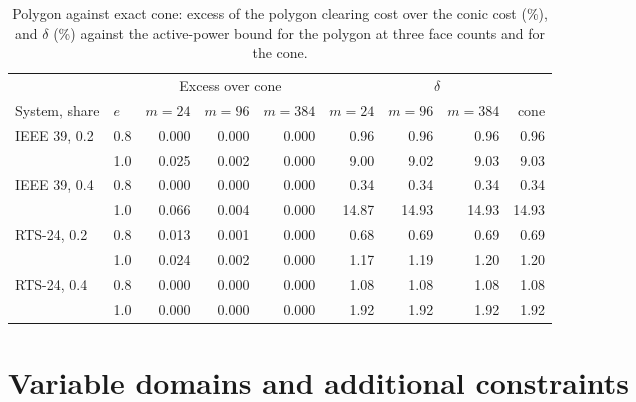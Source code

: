 \documentclass[11pt,a4paper]{article}
\begin{document}
\begin{table}[h]
  \caption{Polygon against exact cone: excess of the polygon clearing cost
  over the conic cost (\%), and $\delta$ (\%) against the active-power bound
  for the polygon at three face counts and for the cone.}
  \label{tab:cone}
  \centering
  \begin{tabular}{ll rrr rrrr}
    \toprule
    & & \multicolumn{3}{c}{Excess over cone} & \multicolumn{4}{c}{$\delta$} \\
    \cmidrule(lr){3-5}\cmidrule(l){6-9}
    System, share & $e$ & $m{=}24$ & $m{=}96$ & $m{=}384$
      & $m{=}24$ & $m{=}96$ & $m{=}384$ & cone \\
    \midrule
    IEEE 39, 0.2 & 0.8 & 0.000 & 0.000 & 0.000 & 0.96 & 0.96 & 0.96 & 0.96 \\
                 & 1.0 & 0.025 & 0.002 & 0.000 & 9.00 & 9.02 & 9.03 & 9.03 \\
    IEEE 39, 0.4 & 0.8 & 0.000 & 0.000 & 0.000 & 0.34 & 0.34 & 0.34 & 0.34 \\
                 & 1.0 & 0.066 & 0.004 & 0.000 & 14.87 & 14.93 & 14.93 & 14.93 \\
    RTS-24, 0.2  & 0.8 & 0.013 & 0.001 & 0.000 & 0.68 & 0.69 & 0.69 & 0.69 \\
                 & 1.0 & 0.024 & 0.002 & 0.000 & 1.17 & 1.19 & 1.20 & 1.20 \\
    RTS-24, 0.4  & 0.8 & 0.000 & 0.000 & 0.000 & 1.08 & 1.08 & 1.08 & 1.08 \\
                 & 1.0 & 0.000 & 0.000 & 0.000 & 1.92 & 1.92 & 1.92 & 1.92 \\
    \bottomrule
  \end{tabular}
\end{table}

\section{Variable domains and additional constraints}
\label{s:domains}
\end{document}
